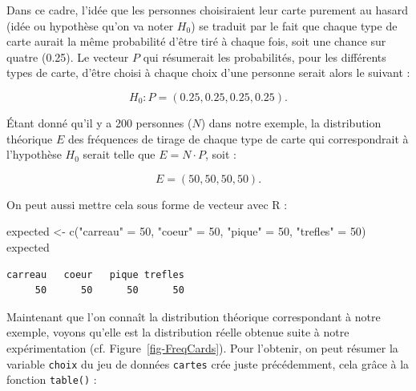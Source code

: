 \documentclass[
  letterpaper,
]{book}
\newenvironment{Shaded}{\begin{snugshade}}{\end{snugshade}}
\newcommand{\CommentTok}[1]{\textcolor[rgb]{0.37,0.37,0.37}{#1}}
\newcommand{\DecValTok}[1]{\textcolor[rgb]{0.68,0.00,0.00}{#1}}
\newcommand{\FunctionTok}[1]{\textcolor[rgb]{0.28,0.35,0.67}{#1}}
\newcommand{\NormalTok}[1]{\textcolor[rgb]{0.00,0.23,0.31}{#1}}
\newcommand{\OtherTok}[1]{\textcolor[rgb]{0.00,0.23,0.31}{#1}}
\newcommand{\SpecialCharTok}[1]{\textcolor[rgb]{0.37,0.37,0.37}{#1}}
\newcommand{\StringTok}[1]{\textcolor[rgb]{0.13,0.47,0.30}{#1}}
\begin{document}
Dans ce cadre, l'idée que les personnes choisiraient leur carte purement
au hasard (idée ou hypothèse qu'on va noter \(H_{0}\)) se traduit par le
fait que chaque type de carte aurait la même probabilité d'être tiré à
chaque fois, soit une chance sur quatre (0.25). Le vecteur \(P\) qui
résumerait les probabilités, pour les différents types de carte, d'être
choisi à chaque choix d'une personne serait alors le suivant :

\[H_{0} : P = (0.25, 0.25, 0.25, 0.25).\]

Étant donné qu'il y a 200 personnes (\(N\)) dans notre exemple, la
distribution théorique \(E\) des fréquences de tirage de chaque type de
carte qui correspondrait à l'hypothèse \(H_{0}\) serait telle que
\(E = N \cdot P\), soit :

\[E = (50, 50, 50, 50).\]

On peut aussi mettre cela sous forme de vecteur avec R :

\begin{Shaded}
\begin{Highlighting}[]
\NormalTok{expected }\OtherTok{\textless{}{-}} \FunctionTok{c}\NormalTok{(}\StringTok{"carreau"} \OtherTok{=} \DecValTok{50}\NormalTok{, }\StringTok{"coeur"} \OtherTok{=} \DecValTok{50}\NormalTok{, }\StringTok{"pique"} \OtherTok{=} \DecValTok{50}\NormalTok{, }\StringTok{"trefles"} \OtherTok{=} \DecValTok{50}\NormalTok{)}
\NormalTok{expected}
\end{Highlighting}
\end{Shaded}

\begin{verbatim}
carreau   coeur   pique trefles 
     50      50      50      50 
\end{verbatim}

Maintenant que l'on connaît la distribution théorique correspondant à
notre exemple, voyons qu'elle est la distribution réelle obtenue suite à
notre expérimentation (cf. Figure~\ref{fig-FreqCards}). Pour l'obtenir,
on peut résumer la variable \texttt{choix} du jeu de données
\texttt{cartes} crée juste précédemment, cela grâce à la fonction
\texttt{table()} :

\begin{Shaded}
\end{Shaded}
\end{document}
